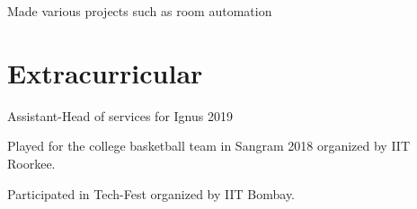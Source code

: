 \documentclass[]{deedy-resume-openfont}
\begin{document}
\begin{minipage}[t]{0.66\textwidth}
\begin{tightemize}
\item Made various projects such as room automation
\end{tightemize}


\section{Extracurricular} 
\begin{tightemize}
\vspace{\topsep} 
\item Assistant-Head of services for Ignus 2019
\item Played for the college basketball team in Sangram 2018 organized by IIT Roorkee.
\item Participated in Tech-Fest organized by IIT Bombay.

\end{tightemize}



\end{minipage} 
\end{document}
